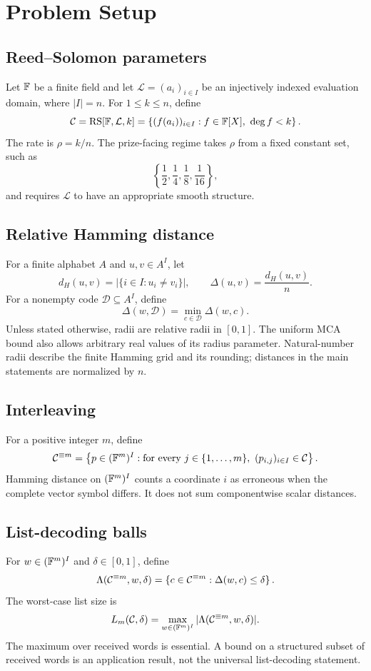 \section{Problem Setup}

\subsection{Reed--Solomon parameters}

Let \(\mathbb{F}\) be a finite field and let
\(\mathcal L=(a_i)_{i\in I}\) be an injectively indexed evaluation domain,
where \(|I|=n\).  For \(1\le k\le n\), define
\[
  \mathcal C=\operatorname{RS}[\mathbb{F},\mathcal L,k]
  =
  \left\{
    (f(a_i))_{i\in I}:
    f\in\mathbb{F}[X],\ \deg f<k
  \right\}.
\]
The rate is \(\rho=k/n\).  The prize-facing regime takes \(\rho\) from a fixed
constant set, such as
\[
  \left\{\frac12,\frac14,\frac18,\frac1{16}\right\},
\]
and requires \(\mathcal L\) to have an appropriate smooth structure.

\subsection{Relative Hamming distance}

For a finite alphabet \(A\) and \(u,v\in A^I\), let
\[
  d_H(u,v)=|\{i\in I:u_i\ne v_i\}|,
  \qquad
  \Delta(u,v)=\frac{d_H(u,v)}{n}.
\]
For a nonempty code \(\mathcal D\subseteq A^I\), define
\[
  \Delta(w,\mathcal D)
  =
  \min_{c\in\mathcal D}\Delta(w,c).
\]
Unless stated otherwise, radii are relative radii in \([0,1]\).
The uniform MCA bound also allows arbitrary real values of its radius
parameter. Natural-number radii describe the finite Hamming grid and its
rounding; distances in the main statements are normalized by \(n\).

\subsection{Interleaving}

For a positive integer \(m\), define
\[
  \mathcal C^{\equiv m}
  =
  \left\{
    p\in(\mathbb{F}^m)^I:
    \text{for every }j\in\{1,\ldots,m\},
    \ (p_{i,j})_{i\in I}\in\mathcal C
  \right\}.
\]
Hamming distance on \((\mathbb{F}^m)^I\) counts a coordinate \(i\) as erroneous when
the complete vector symbol differs.  It does not sum componentwise scalar
distances.

\subsection{List-decoding balls}

For \(w\in(\mathbb{F}^m)^I\) and \(\delta\in[0,1]\), define
\[
  \Lambda(\mathcal C^{\equiv m},w,\delta)
  =
  \left\{
    c\in\mathcal C^{\equiv m}:
    \Delta(w,c)\le\delta
  \right\}.
\]
The worst-case list size is
\[
  L_m(\mathcal C,\delta)
  =
  \max_{w\in(\mathbb{F}^m)^I}
    |\Lambda(\mathcal C^{\equiv m},w,\delta)|.
\]
The maximum over received words is essential.  A bound on a structured subset
of received words is an application result, not the universal list-decoding
statement.
